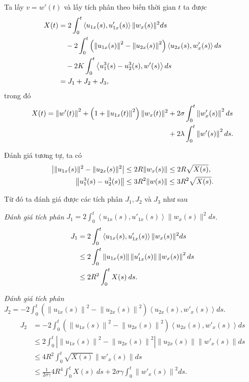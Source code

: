 \documentclass[12pt,a4paper]{article}
\theoremstyle{definition}
\theoremstyle{definition}
\begin{document}
Ta lấy $v = w'(t)$ và lấy tích phân theo biến thời gian $t$ ta được
\begin{align}
     X(t) &= 2 \int_0^t \left<u_{1x}(s), u'_{1x}(s)\right> \|w_x(s)\|^2 ds \\
     &\quad -2 \int_0^t \left(\left\|u_{1x}(s)\right\|^2 - \left\|u_{2x}(s)\right\|^2\right) \left<u_{2x}(s), w'_x(s)\right> ds \notag \\
     &\quad - 2K \int_0^t \left<u_1^3(s) - u_2^3(s), w'(s)\right> ds \notag \\
     &= J_1 + J_2 + J_3, \notag
\end{align}
trong đó
\begin{align} \label{390}
    X(t) = \left\|w'(t)\right\|^2
    + \left(1 + \left\|u_{1x}(t)\right\|^2\right) \|w_x(t)\|^2
    &+ 2 \sigma \int_0^t \left\|w'_x(s)\right\|^2 ds \\
    &+ 2 \lambda \int_0^t \left\|w'(s)\right\|^2 ds. \notag
\end{align}

Đánh giá tương tự, ta có
\begin{align}
    \left|\|u_{1x}(s)\|^2 - \|u_{2x}(s)\|^2\right| &\le 2R \|w_x(s)\| \le 2R \sqrt{X(s)}, \\
    \left\|u_1^3(s) - u_2^3(s)\right\| &\le 3R^2 \|w(s)\| \le 3R^2 \sqrt{X(s)}. \notag
\end{align}

Từ đó ta đánh giá được các tích phân $J_1, J_2$ và $J_3$ như sau

\textit{Đánh giá tích phân} $\displaystyle J_1 = 2 \int_0^t \left<u_{1x}(s), u'_{1x}(s)\right> \|w_x(s)\|^2 ds$.
\begin{align} \label{393}
    J_1 &= 2 \int_0^t \left<u_{1x}(s), u'_{1x}(s)\right> \|w_x(s)\|^2 ds \\
    &\le 2 \int_0^t \left\|u_{1x}(s)\right\| \left\|u'_{1x}(s)\right\| \left\|w_x(s)\right\|^2 ds \notag \\
    &\le 2R^2 \int_0^t X(s)\:ds. \notag
\end{align}

\textit{Đánh giá tích phân} $\displaystyle J_2 = -2 \int_0^t \left(\left\|u_{1x}(s)\right\|^2 - \left\|u_{2x}(s)\right\|^2\right) \left<u_{2x}(s), w'_x(s)\right> ds$.
\begin{align*}
    J_2 &= -2 \int_0^t \left(\left\|u_{1x}(s)\right\|^2 - \left\|u_{2x}(s)\right\|^2\right) \left<u_{2x}(s), w'_x(s)\right> ds \\
    &\le 2 \int_0^t \left|\left\|u_{1x}(s)\right\|^2 - \left\|u_{2x}(s)\right\|^2\right| \left\|u_{2x}(s)\right\| \left\|w'_x(s)\right\| ds \\
    &\le 4R^2 \int_0^t \sqrt{X(s)} \|w'_x(s)\| ds \\
    &\le \frac{1}{2\sigma \gamma} 4R^4 \int_0^t X(s)\:ds + 2 \sigma \gamma \int_0^t \left\|w'_x(s)\right\|^2 ds.
\end{align*}
\end{document}
